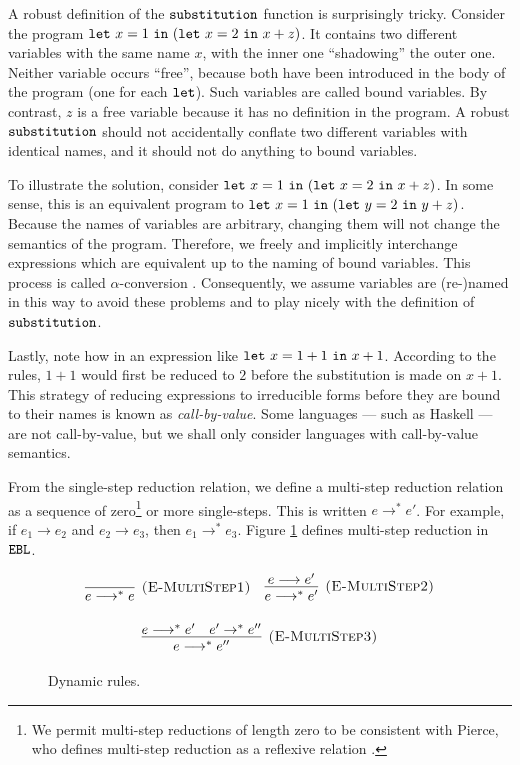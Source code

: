 A robust definition of the $\mathtt{substitution}$ function is surprisingly tricky. Consider the program $\mathtt{let}~ x = 1~\mathtt{in}~ (\mathtt{let}~ x = 2~\mathtt{in}~ x+z)$. It contains two different variables with the same name $x$, with the inner one ``shadowing'' the outer one. Neither variable occurs ``free'', because both have been introduced in the body of the program (one for each $\mathtt{let}$). Such variables are called bound variables. By contrast, $z$ is a free variable because it has no definition in the program. A robust $\mathtt{substitution}$ should not accidentally conflate two different variables with identical names, and it should not do anything to bound variables.

To illustrate the solution, consider $\mathtt{let}~ x = 1~\mathtt{in}~ (\mathtt{let}~ x = 2~\mathtt{in}~ x+z)$. In some sense, this is an equivalent program to $\mathtt{let}~ x = 1~\mathtt{in}~ (\mathtt{let}~ y = 2~\mathtt{in}~ y+z)$. Because the names of variables are arbitrary, changing them will not change the semantics of the program. Therefore, we freely and implicitly interchange expressions which are equivalent up to the naming of bound variables. This process is called $\alpha$-conversion \cite[p. 71]{tapl}. Consequently, we assume variables are (re-)named in this way to avoid these problems and to play nicely with the definition of $\mathtt{substitution}$.

Lastly, note how in an expression like $\mathtt{let}~ x = 1+1~\mathtt{in}~ x+1$. According to the rules, $1+1$ would first be reduced to $2$ before the substitution is made on $x+1$. This strategy of reducing expressions to irreducible forms before they are bound to their names is known as \textit{call-by-value}. Some languages --- such as Haskell --- are not call-by-value, but we shall only consider languages with call-by-value semantics.

From the single-step reduction relation, we define a multi-step reduction relation as a sequence of zero\footnote{We permit multi-step reductions of length zero to be consistent with Pierce, who defines multi-step reduction as a reflexive relation \cite[p. 39]{tapl}.} or more single-steps. This is written $e \longrightarrow^* e'$. For example, if $e_1 \longrightarrow e_2$ and $e_2 \longrightarrow e_3$, then $e_1 \longrightarrow^* e_3$. Figure \ref{fig:ebl_dyn_multistep} defines multi-step reduction in $\mathtt{EBL}$.


\begin{figure}[h]

\noindent
{}

\[
\begin{array}{c}

\infer[\textsc{(E-MultiStep1)}]
	{ e \longrightarrow^{*}  e}
	{}
~~~
\infer[\textsc{(E-MultiStep2)}]
	{ e \longrightarrow^{*}  e'}
	{ e \longrightarrow  e'} \\[3ex]
	
\infer[\textsc{(E-MultiStep3)}]
	{e \longrightarrow^{*}  e''}
	{ e \longrightarrow^{*}  e' &  e' \rightarrow^{*}  e''}
\end{array}
\]
\vspace{-12pt}
\caption{Dynamic rules.}
\label{fig:ebl_dyn_multistep}
\end{figure}





